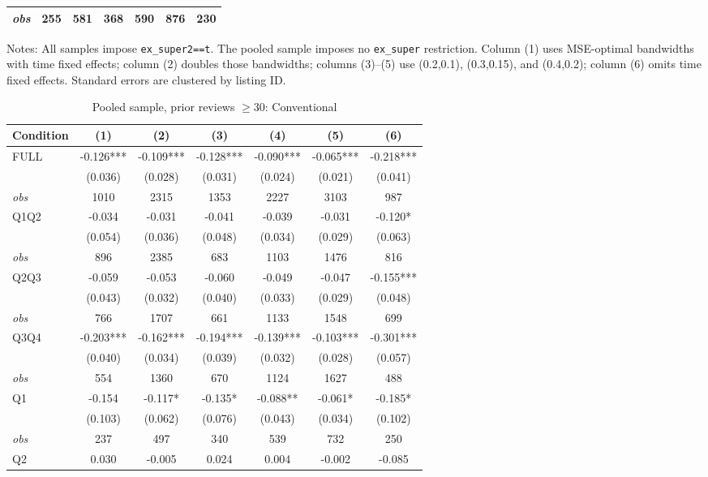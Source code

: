 \begin{table}[!htbp]
\begin{tabular}{lcccccc}
\textit{obs} & 255 & 581 & 368 & 590 & 876 & 230 \\
\bottomrule
\end{tabular}
\begin{minipage}{0.98\textwidth}\footnotesize
Notes: All samples impose \texttt{ex\_super2==t}. The pooled sample imposes no \texttt{ex\_super} restriction. Column (1) uses MSE-optimal bandwidths with time fixed effects; column (2) doubles those bandwidths; columns (3)--(5) use (0.2,0.1), (0.3,0.15), and (0.4,0.2); column (6) omits time fixed effects. Standard errors are clustered by listing ID.
\end{minipage}
\end{table}

\begin{table}[!htbp]
\centering
\caption{Pooled sample, prior reviews $\geq30$: Conventional}
\begin{tabular}{lcccccc}
\toprule
Condition & (1) & (2) & (3) & (4) & (5) & (6) \\
\midrule
FULL & -0.126*** & -0.109*** & -0.128*** & -0.090*** & -0.065*** & -0.218*** \\
 & (0.036) & (0.028) & (0.031) & (0.024) & (0.021) & (0.041) \\
\textit{obs} & 1010 & 2315 & 1353 & 2227 & 3103 & 987 \\
Q1Q2 & -0.034 & -0.031 & -0.041 & -0.039 & -0.031 & -0.120* \\
 & (0.054) & (0.036) & (0.048) & (0.034) & (0.029) & (0.063) \\
\textit{obs} & 896 & 2385 & 683 & 1103 & 1476 & 816 \\
Q2Q3 & -0.059 & -0.053 & -0.060 & -0.049 & -0.047 & -0.155*** \\
 & (0.043) & (0.032) & (0.040) & (0.033) & (0.029) & (0.048) \\
\textit{obs} & 766 & 1707 & 661 & 1133 & 1548 & 699 \\
Q3Q4 & -0.203*** & -0.162*** & -0.194*** & -0.139*** & -0.103*** & -0.301*** \\
 & (0.040) & (0.034) & (0.039) & (0.032) & (0.028) & (0.057) \\
\textit{obs} & 554 & 1360 & 670 & 1124 & 1627 & 488 \\
Q1 & -0.154 & -0.117* & -0.135* & -0.088** & -0.061* & -0.185* \\
 & (0.103) & (0.062) & (0.076) & (0.043) & (0.034) & (0.102) \\
\textit{obs} & 237 & 497 & 340 & 539 & 732 & 250 \\
Q2 & 0.030 & -0.005 & 0.024 & 0.004 & -0.002 & -0.085 \\

\end{tabular}
\end{table}
